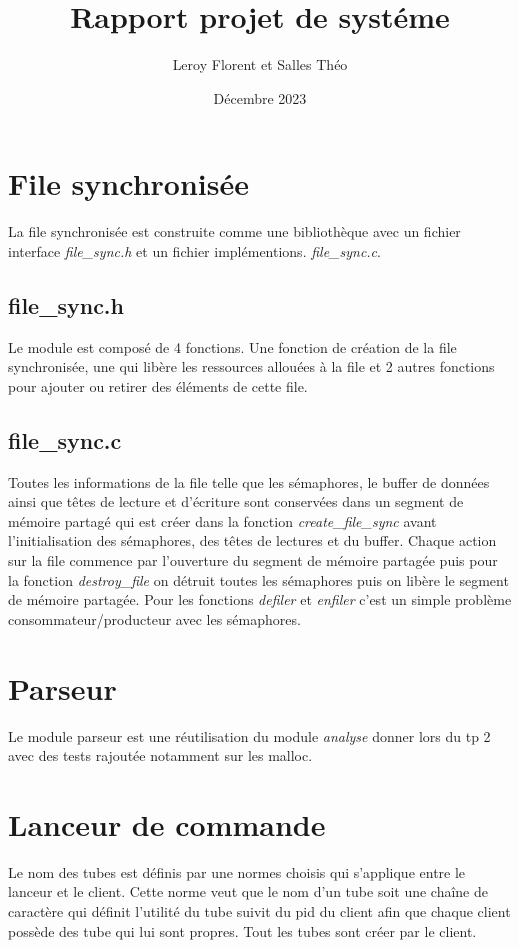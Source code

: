 \documentclass[12pt]{article}
\title{Rapport projet de systéme}
\author{Leroy Florent et Salles Théo}
\date{Décembre 2023}
\begin{document}
\maketitle
\tableofcontents
\newpage
\section{File synchronisée}
La file synchronisée est construite comme une bibliothèque avec un fichier
interface \textit{file\_sync.h} et un fichier implémentions.
\textit{file\_sync.c}.
\subsection{file\_sync.h}
Le module est composé de 4 fonctions. Une fonction de création de la file
synchronisée, une qui libère les ressources allouées à la file et 2 autres
fonctions pour ajouter
ou retirer des éléments de cette file.
\subsection{file\_sync.c}
Toutes les informations de la file telle que les sémaphores, le buffer de
données
ainsi que
têtes de lecture
et d'écriture sont conservées dans un segment de mémoire partagé qui est créer
dans la fonction \textit{create\_file\_sync} avant l'initialisation des
sémaphores,
des têtes de lectures et du buffer.
Chaque action sur la file commence par l'ouverture du segment de mémoire
partagée
puis pour la fonction \textit{destroy\_file} on détruit toutes les sémaphores
puis on libère le segment de mémoire partagée. Pour les fonctions
\textit{defiler} et \textit{enfiler}
c'est un simple problème consommateur/producteur avec les sémaphores.
\section{Parseur}
Le module parseur est une réutilisation du module \textit{analyse} donner lors
du tp 2
avec des tests rajoutée notamment sur les malloc.
\section{Lanceur de commande}
Le nom des tubes est définis par une normes choisis qui s'applique
entre le lanceur et le client. Cette norme veut que le nom d'un tube soit une
chaîne de caractère qui
définit l'utilité du tube suivit du pid du client afin que chaque client
possède des tube qui lui sont propres. Tout les tubes sont créer par le client.
\end{document}
